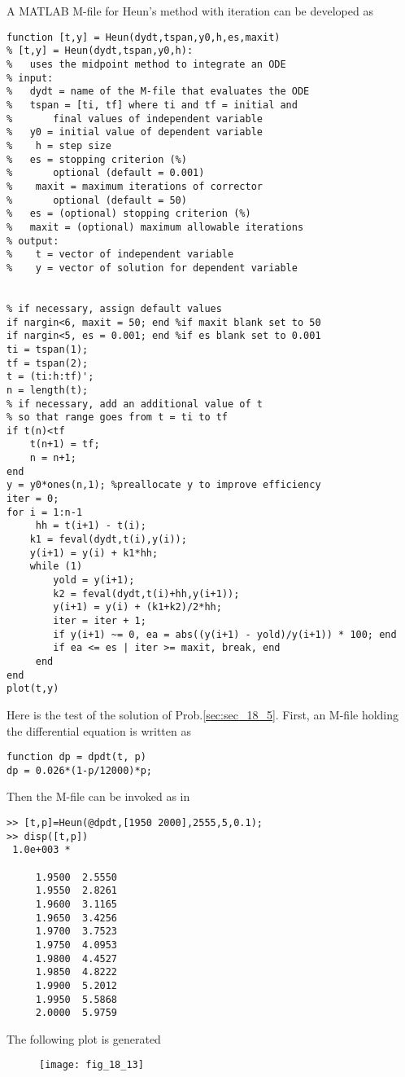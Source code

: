 \documentclass[../main.tex]{subfiles}
\begin{document}
\section{}
A MATLAB M-file for Heun's method with iteration can be developed as
\begin{lstlisting}[numbers=none]
function [t,y] = Heun(dydt,tspan,y0,h,es,maxit)
% [t,y] = Heun(dydt,tspan,y0,h):
% 	uses the midpoint method to integrate an ODE
% input:
% 	dydt = name of the M-file that evaluates the ODE
% 	tspan = [ti, tf] where ti and tf = initial and
% 		final values of independent variable
% 	y0 = initial value of dependent variable
%	 h = step size
% 	es = stopping criterion (%)
% 		optional (default = 0.001)
%	 maxit = maximum iterations of corrector
% 		optional (default = 50)
% 	es = (optional) stopping criterion (%)
% 	maxit = (optional) maximum allowable iterations
% output:
%	 t = vector of independent variable
%	 y = vector of solution for dependent variable


% if necessary, assign default values
if nargin<6, maxit = 50; end %if maxit blank set to 50
if nargin<5, es = 0.001; end %if es blank set to 0.001
ti = tspan(1);
tf = tspan(2);
t = (ti:h:tf)';
n = length(t);
% if necessary, add an additional value of t
% so that range goes from t = ti to tf
if t(n)<tf
 	t(n+1) = tf;
 	n = n+1;
end
y = y0*ones(n,1); %preallocate y to improve efficiency
iter = 0;
for i = 1:n-1
	 hh = t(i+1) - t(i);
 	k1 = feval(dydt,t(i),y(i));
 	y(i+1) = y(i) + k1*hh;
 	while (1)
 		yold = y(i+1);
 		k2 = feval(dydt,t(i)+hh,y(i+1));
 		y(i+1) = y(i) + (k1+k2)/2*hh;
 		iter = iter + 1;
 		if y(i+1) ~= 0, ea = abs((y(i+1) - yold)/y(i+1)) * 100; end
 		if ea <= es | iter >= maxit, break, end
	 end
end
plot(t,y) 
\end{lstlisting}
	\bigbreak
Here is the test of the solution of Prob.\ref{sec:sec_18_5}. First, an M-file holding the differential
equation is written as
	\bigbreak
\begin{lstlisting}[numbers=none]
function dp = dpdt(t, p)
dp = 0.026*(1-p/12000)*p; 
\end{lstlisting}
	\bigbreak
Then the M-file can be invoked as in
	\bigbreak
\begin{lstlisting}[numbers=none]
>> [t,p]=Heun(@dpdt,[1950 2000],2555,5,0.1);
>> disp([t,p])
 1.0e+003 *

 	 1.9500	 2.5550
	 1.9550	 2.8261
	 1.9600	 3.1165
	 1.9650	 3.4256
	 1.9700	 3.7523
	 1.9750	 4.0953
	 1.9800	 4.4527
	 1.9850	 4.8222
	 1.9900	 5.2012
	 1.9950	 5.5868
	 2.0000	 5.9759 

\end{lstlisting}
	\bigbreak
The following plot is generated
	\bigbreak
	\begin{figure}[H]
		\texttt{[image: fig\_18\_13]}
		\label{fig:fig_18_13}
	\end{figure}
	\bigbreak
\end{document}
